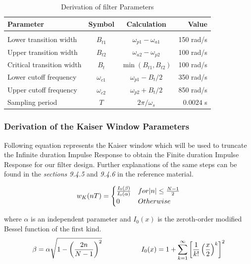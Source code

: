 \documentclass[a4paper,11pt]{article}%
\begin{document}
\begin{table}[!h]
	\centering	
\begin{tabular}{l c c r}
	\hline
\textbf{Parameter}& \textbf{Symbol}& \textbf{Calculation}&\textbf{Value}\\\hline
&&&\\
Lower transition width& $B_{t1}$& $\omega_{p1} - \omega_{a1}$&150 rad/s\\
Upper transition width& $B_{t2}$&$\omega_{a2}-\omega_{p2}$&100 rad/s\\
Critical transition width& $B_t$&$\min(B_{t1},B_{t2})$&100 rad/s\\
Lower cutoff frequency& $\omega_{c1}$&$\omega_{p1}-B_t/2$&350 rad/s\\
Upper cutoff frequency& $\omega_{c2}$&$\omega_{p2}+B_t/2 $&850 rad/s \\
Sampling period& $T$& $2\pi / \omega_s$&$0.0024$ s\\
\hline\hline
\end{tabular}
\caption{Derivation of filter Parameters}
\end{table}

\subsubsection{Derivation of the Kaiser Window Parameters}

Following equation represents the Kaiser window which will be used to truncate the Infinite duration Impulse Response to obtain the Finite duration Impulse Response for our filter design. Further explanations of the same steps can be found in the \textit{sections 9.4.5} and \textit{9.4.6} in the reference material\cite{antonio}.

\begin{equation}
w_K(nT) = \begin{cases}
	\frac{I_0(\beta)}{I_0(\alpha)} & for \abs{n}  \leq \frac{N-1}{2} \\
	0 & Otherwise
	\label{kaiser}
\end{cases}
\end{equation}


where $\alpha$ is an independent parameter and $I_0(x)$ is the zeroth-order modified Bessel function of the first kind.\\
\[
\beta = \alpha\sqrt{1-\left(\frac{2n}{N-1}\right)^2} \hspace*{1cm} \hspace*{1cm} I_0(x) = 1+\sum_{k=1}^{\infty}\left[\frac{1}{k!}\left(\frac{x}{2}\right)^k\right]^2
 \]
\end{document}
